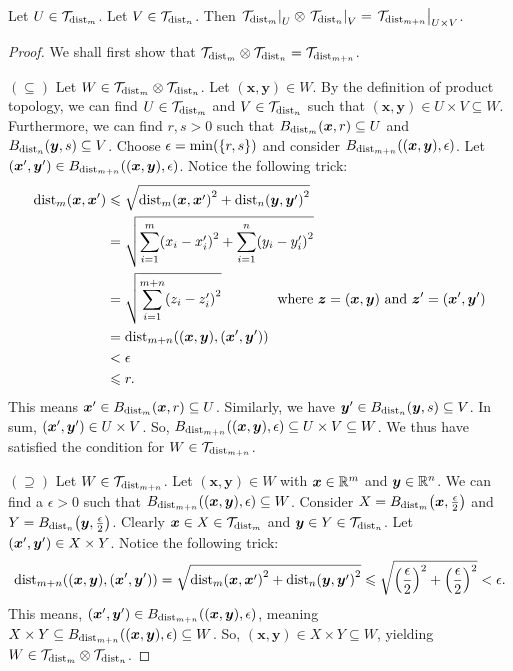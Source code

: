 \documentclass[11pt,reqno]{amsart}
\begin{document}
\begin{Thm}\label{thm:euclid-prod}
Let $U\in\mathcal{T}_{\mathrm{dist}_m}$. Let $V\in\mathcal{T}_{\mathrm{dist}_n}$.
Then
$
\eval{\T_{\dist_m}}_U\otimes\eval{\T_{\dist_n}}_V
=\eval{\T_{\dist_{m+n}}}_{U\times V}
$.
\end{Thm}
\begin{proof}
We shall first show that
$\mathcal{T}_{\mathrm{dist}_m}\otimes\mathcal{T}_{\mathrm{dist}_n}=\mathcal{T}_{\mathrm{dist}_{m+n}}$.

$(\subseteq)$
Let $W\in\mathcal{T}_{\mathrm{dist}_m}\otimes\mathcal{T}_{\mathrm{dist}_n}$.
Let $(\bm x,\bm y)\in W$.
By the definition of product topology, we can find
$U\in\mathcal{T}_{\mathrm{dist}_m}$ and $V\in\mathcal{T}_{\mathrm{dist}_n}$ such that
$(\bm x,\bm y)\in U\times V\subseteq W$.
Furthermore, we can find $r,s>0$ such that
$B_{\mathrm{dist}_m}(\bm x,r)\subseteq U$ and
$B_{\mathrm{dist}_n}(\bm y,s)\subseteq V$.
Choose $\epsilon=\min\Br{\set{r,s}}$
and consider $B_{\mathrm{dist}_{m+n}}((\bm x,\bm y),\epsilon)$.
Let $\Br{\bm x',\bm y'}\in B_{\dist_{m+n}}((\bm x,\bm y),\epsilon)$.
Notice the following trick:
\[\begin{aligned}
\dist_m\Br{\bm x,\bm x'}
&\le\sqrt{\dist_m\Br{\bm x,\bm x'}^2+\dist_n\Br{\bm y,\bm y'}^2}\\
&=\sqrt{\sum_{i=1}^m\Br{x_i-x_i'}^2+\sum_{i=1}^n\Br{y_i-y_i'}^2}\\
&=\sqrt{\sum_{i=1}^{m+n}\Br{z_i-z_i'}^2}
\qquad\qquad
\text{where $\bm z=(\bm x,\bm y)$ and $\bm z'=\Br{\bm x',\bm y'}$}\\
&=\dist_{m+n}\Br{(\bm x,\bm y),\Br{\bm x',\bm y'}}\\
&<\epsilon\\
&\le r.
\end{aligned}\]
This means $\bm x'\in B_{\mathrm{dist}_m}(\bm x,r)\subseteq U$.
Similarly, we have $\bm y'\in B_{\mathrm{dist}_n}(\bm y,s)\subseteq V$.
In sum, $\Br{\bm x',\bm y'}\in U\times V$.
So, $B_{\mathrm{dist}_{m+n}}((\bm x,\bm y),\epsilon)\subseteq U\times V\subseteq W$.
We thus have satisfied the condition for $W\in\mathcal{T}_{\mathrm{dist}_{m+n}}$.

$(\supseteq)$
Let $W\in\mathcal{T}_{\mathrm{dist}_{m+n}}$.
Let $(\bm x,\bm y)\in W$ with $\bm x\in\mathbb{R}^m$ and $\bm y\in\mathbb{R}^n$.
We can find a $\epsilon>0$ such that
$B_{\dist_{m+n}}\Br{(\bm x,\bm y),\epsilon}\subseteq W$.
Consider $X=B_{\dist_m}\Br{\bm x,\frac\epsilon2}$ and
$Y=B_{\dist_n}\Br{\bm y,\frac\epsilon2}$.
Clearly $\bm x\in X\in\mathcal{T}_{\mathrm{dist}_m}$ and $\bm y\in Y\in\mathcal{T}_{\mathrm{dist}_n}$.
Let $\Br{\bm x',\bm y'}\in X\times Y$.
Notice the following trick:
\[
\dist_{m+n}\Br{(\bm x,\bm y),\Br{\bm x',\bm y'}}
=\sqrt{\dist_m\Br{\bm x,\bm x'}^2+\dist_n\Br{\bm y,\bm y'}^2}\\
\le\sqrt{\Br{\frac\epsilon2}^2+\Br{\frac\epsilon2}^2}<\epsilon.
\]
This means, $\Br{\bm x',\bm y'}\in B_{\dist_{m+n}}\Br{(\bm x,\bm y),\epsilon}$,
meaning
$X\times Y\subseteq B_{\dist_{m+n}}\Br{(\bm x,\bm y),\epsilon}\subseteq W$.
So, $(\bm x,\bm y)\in X\times Y\subseteq W$, yielding
$W\in\mathcal{T}_{\mathrm{dist}_m}\otimes\mathcal{T}_{\mathrm{dist}_n}$.


\end{proof}
\end{document}
